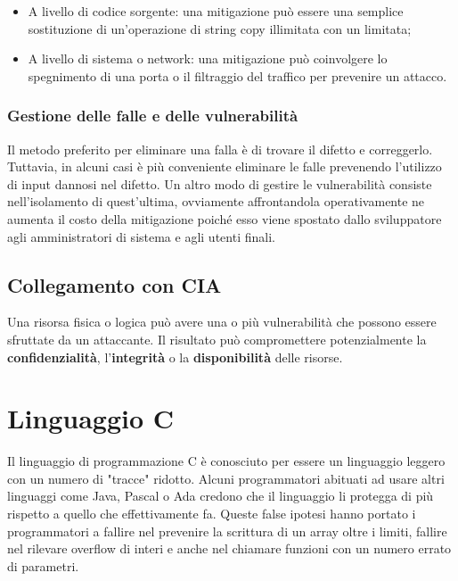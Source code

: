 \begin{itemize}
    \item A livello di codice sorgente: una mitigazione può essere una semplice
          sostituzione di un'operazione di string copy illimitata con un limitata;
    \item A livello di sistema o network: una mitigazione può coinvolgere lo
          spegnimento di una porta o il filtraggio del traffico per prevenire un attacco.
\end{itemize}

\subsection{Gestione delle falle e delle vulnerabilità}

Il metodo preferito per eliminare una falla è di trovare il difetto e correggerlo.
Tuttavia, in alcuni casi è più conveniente eliminare le falle prevenendo l'utilizzo
di input dannosi nel difetto. Un altro modo di gestire le vulnerabilità consiste
nell'isolamento di quest'ultima, ovviamente affrontandola operativamente ne aumenta
il costo della mitigazione poiché esso viene spostato dallo sviluppatore agli
amministratori di sistema e agli utenti finali.

\section{Collegamento con CIA}

Una risorsa fisica o logica può avere una o più vulnerabilità che possono essere
sfruttate da un attaccante. Il risultato può compromettere potenzialmente
la \textbf{confidenzialità}, l'\textbf{integrità} o la \textbf{disponibilità}
delle risorse.

\chapter{Linguaggio C}

Il linguaggio di programmazione C è conosciuto per essere un linguaggio leggero con
un numero di "tracce" ridotto.
Alcuni programmatori abituati ad usare altri linguaggi come Java, Pascal o Ada
credono che il linguaggio li protegga di più rispetto a quello che effettivamente fa.
Queste false ipotesi hanno portato i programmatori a fallire nel prevenire la
scrittura di un array oltre i limiti, fallire nel rilevare overflow di interi e
anche nel chiamare funzioni con un numero errato di parametri.

